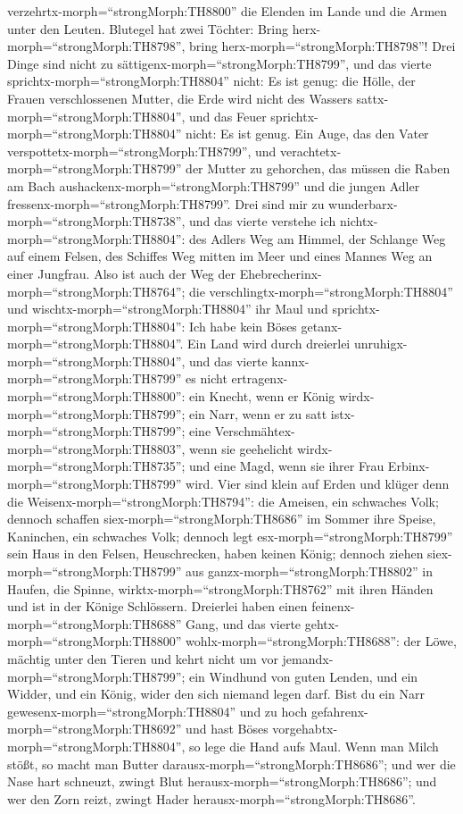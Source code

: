 verzehrtx-morph=``strongMorph:TH8800'' die Elenden im Lande und die
Armen unter den Leuten.  Blutegel hat zwei Töchter: Bring
herx-morph=``strongMorph:TH8798'', bring
herx-morph=``strongMorph:TH8798''! Drei Dinge sind nicht zu
sättigenx-morph=``strongMorph:TH8799'', und das vierte
sprichtx-morph=``strongMorph:TH8804'' nicht: Es ist genug: 
die Hölle, der Frauen verschlossenen Mutter, die Erde wird nicht des
Wassers sattx-morph=``strongMorph:TH8804'', und das Feuer
sprichtx-morph=``strongMorph:TH8804'' nicht: Es ist genug. 
Ein Auge, das den Vater verspottetx-morph=``strongMorph:TH8799'', und
verachtetx-morph=``strongMorph:TH8799'' der Mutter zu gehorchen, das
müssen die Raben am Bach aushackenx-morph=``strongMorph:TH8799'' und die
jungen Adler fressenx-morph=``strongMorph:TH8799''.  Drei
sind mir zu wunderbarx-morph=``strongMorph:TH8738'', und das vierte
verstehe ich nichtx-morph=``strongMorph:TH8804'':  des
Adlers Weg am Himmel, der Schlange Weg auf einem Felsen, des Schiffes
Weg mitten im Meer und eines Mannes Weg an einer Jungfrau. 
Also ist auch der Weg der Ehebrecherinx-morph=``strongMorph:TH8764'';
die verschlingtx-morph=``strongMorph:TH8804'' und
wischtx-morph=``strongMorph:TH8804'' ihr Maul und
sprichtx-morph=``strongMorph:TH8804'': Ich habe kein Böses
getanx-morph=``strongMorph:TH8804''.  Ein Land wird durch
dreierlei unruhigx-morph=``strongMorph:TH8804'', und das vierte
kannx-morph=``strongMorph:TH8799'' es nicht
ertragenx-morph=``strongMorph:TH8800'':  ein Knecht, wenn
er König wirdx-morph=``strongMorph:TH8799''; ein Narr, wenn er zu satt
istx-morph=``strongMorph:TH8799'';  eine
Verschmähtex-morph=``strongMorph:TH8803'', wenn sie geehelicht
wirdx-morph=``strongMorph:TH8735''; und eine Magd, wenn sie ihrer Frau
Erbinx-morph=``strongMorph:TH8799'' wird.  Vier sind klein
auf Erden und klüger denn die Weisenx-morph=``strongMorph:TH8794'':
 die Ameisen, ein schwaches Volk; dennoch schaffen
siex-morph=``strongMorph:TH8686'' im Sommer ihre Speise, 
Kaninchen, ein schwaches Volk; dennoch legt
esx-morph=``strongMorph:TH8799'' sein Haus in den Felsen, 
Heuschrecken, haben keinen König; dennoch ziehen
siex-morph=``strongMorph:TH8799'' aus ganzx-morph=``strongMorph:TH8802''
in Haufen,  die Spinne, wirktx-morph=``strongMorph:TH8762''
mit ihren Händen und ist in der Könige Schlössern. 
Dreierlei haben einen feinenx-morph=``strongMorph:TH8688'' Gang, und das
vierte gehtx-morph=``strongMorph:TH8800''
wohlx-morph=``strongMorph:TH8688'':  der Löwe, mächtig
unter den Tieren und kehrt nicht um vor
jemandx-morph=``strongMorph:TH8799'';  ein Windhund von
guten Lenden, und ein Widder, und ein König, wider den sich niemand
legen darf.  Bist du ein Narr
gewesenx-morph=``strongMorph:TH8804'' und zu hoch
gefahrenx-morph=``strongMorph:TH8692'' und hast Böses
vorgehabtx-morph=``strongMorph:TH8804'', so lege die Hand aufs Maul.
 Wenn man Milch stößt, so macht man Butter
darausx-morph=``strongMorph:TH8686''; und wer die Nase hart schneuzt,
zwingt Blut herausx-morph=``strongMorph:TH8686''; und wer den Zorn
reizt, zwingt Hader herausx-morph=``strongMorph:TH8686''.

